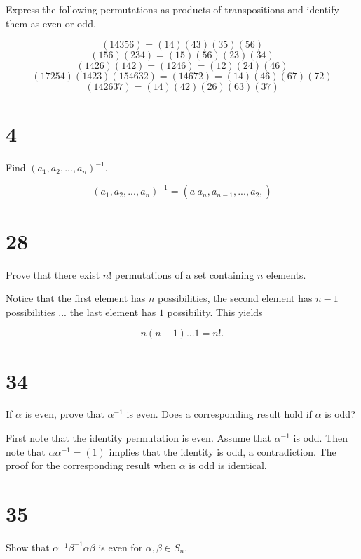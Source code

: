 \documentclass[a4paper]{article}
\begin{document}
Express the following permutations as products of transpositions and identify them as even or odd.

$$(14356) = (14)(43)(35)(56)$$
$$(156)(234) = (15)(56)(23)(34)$$
$$(1426)(142) = (1246) = (12)(24)(46)$$
$$(17254)(1423)(154632) = (14672) = (14)(46)(67)(72)$$
$$(142637) = (14)(42)(26)(63)(37)$$



\section*{4}

Find $(a_1, a_2, ..., a_n)^{-1}$.

$$(a_1, a_2, ..., a_n)^{-1} = (a_, a_n, a_{n-1}, ..., a_2,)$$


\section*{28}

Prove that there exist $n!$ permutations of a set containing $n$ elements.

\vspace{\baselineskip}

Notice that the first element has $n$ possibilities, the second element  has $n-1$ possibilities ... the last element has $1$ possibility. This yields

$$n(n-1)...1 = n!.$$


\section*{34}

If $\alpha$ is even, prove that $\alpha^{-1}$ is even. Does a corresponding result hold if $\alpha$ is odd?

\vspace{\baselineskip}

First note that the identity permutation is even. Assume that $\alpha^{-1}$ is odd. Then note that $\alpha \alpha^{-1} = (1)$ implies that the identity is odd, a contradiction. The proof for the corresponding result when $\alpha$ is odd is identical.


\section*{35}

Show that $\alpha^{-1} \beta^{-1} \alpha \beta$ is even for $\alpha, \beta \in S_n$.
\end{document}
